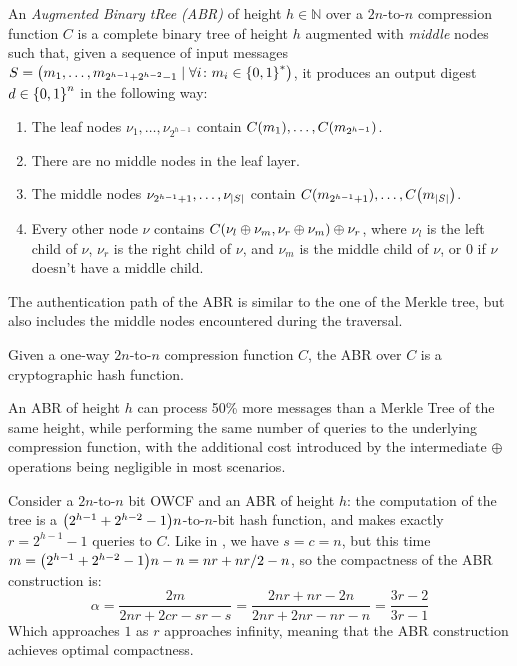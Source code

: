 \begin{definition}
	An \emph{Augmented Binary tRee (ABR)} of height \(h \in \mathbb{N}\) over a 
	\(2n\)-to-\(n\) compression function \(C\) is a complete binary tree of height \(h\) 
	augmented with \emph{middle} nodes such that, given a sequence of input messages
	\(S = \left(m_1, \dots, m_{2^{h-1} + 2^{h-2}-1} \mid \forall i\colon m_i \in \left\{0, 1\right\}^{*}\right)\), 
	it produces an output digest \(d \in \left\{0, 1\right\}^n\) in the following way:
	\begin{enumerate}
		\item The leaf nodes \(\nu_{1}, \dots, \nu_{2^{h-1}}\) contain \(\call{C}{m_1}, \dots,
		      \call{C}{m_{2^{h-1}}}\).
		\item There are no middle nodes in the leaf layer.
		\item The middle nodes \(\nu_{2^{h-1}+1}, \dots, \nu_{\left\lvert S\right\rvert}\) contain
		      \(\call{C}{m_{2^{h-1}+1}}, \dots, \call{C}{m_{\abs{S}}}\).
		\item Every other node \(\nu \) contains \(\call{C}{\nu_l \oplus \nu_m, \nu_r \oplus
		      \nu_m} \oplus \nu_r \), where \(\nu_l\) is the left child of \(\nu \), \(\nu_r\)
		      is the right child of \(\nu \), and \(\nu_m\) is the middle child of \(\nu \), or \(0\)
		      if \(\nu \) doesn't have a middle child.
	\end{enumerate}
\end{definition}

The authentication path of the ABR is similar to the one of the Merkle tree, but also includes 
the middle nodes encountered during the traversal.

\begin{proposition}
	Given a one-way \(2n\)-to-\(n\) compression function \(C\), the ABR over \(C\) is a cryptographic 
	hash function.
\end{proposition}

An ABR of height \(h\) can process 50\% more messages than a Merkle Tree of the same height, 
while performing the same number of queries to the underlying compression function, with the 
additional cost introduced by the intermediate \(\oplus \) operations being negligible in most 
scenarios.

\begin{example}
	Consider a \(2n\)-to-\(n\) bit OWCF and an ABR of height \(h\): the computation 
	of the tree is a \(\Parens*{2^{h-1} + 2^{h-2}-1}n\)-to-\(n\)-bit hash function, 
	and makes exactly \(r = 2^{h-1} - 1\) queries to \(C\).
	Like in , we have \(s = c = n\), but this time 
	\(m = \Parens*{2^{h-1} + 2^{h-2}-1}n - n = nr + {nr}/2 - n\), so the compactness of the ABR 
	construction is:
	\[
		\alpha = \frac{2m}{2nr + 2cr - sr - s} = 
		\frac{2nr + nr - 2n}{2nr + 2nr - nr - n} =
		\frac{3r - 2}{3r - 1}
	\]
	Which approaches \(1\) as \(r\) approaches infinity, meaning that the ABR construction achieves
	optimal compactness.
\end{example}

